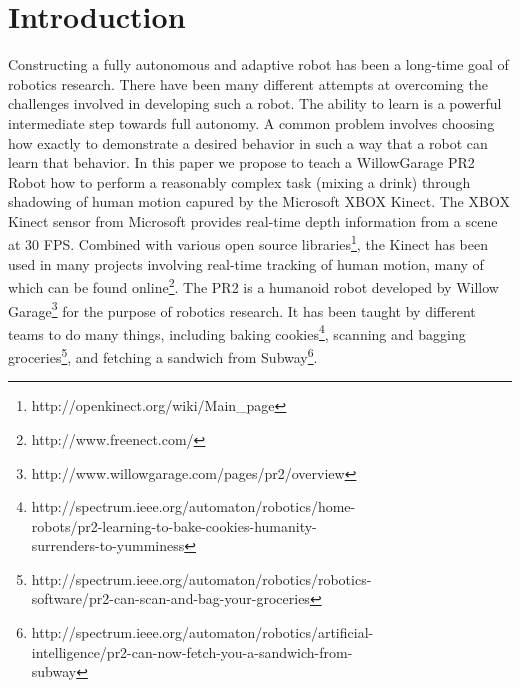 \documentclass{sig-alternate}
\begin{document}
\section{Introduction}
\label{sec:intro}
Constructing a fully autonomous and adaptive robot has been a long-time goal of robotics research. There have been many different attempts at overcoming the challenges involved in developing such a robot. The ability to learn is a powerful intermediate step towards full autonomy. A common problem involves choosing how exactly to demonstrate a desired behavior in such a way that a robot can learn that behavior. In this paper we propose to teach a WillowGarage PR2 Robot how to perform a reasonably complex task (mixing a drink) through shadowing of human motion capured by the Microsoft XBOX Kinect. The XBOX Kinect sensor from Microsoft provides real-time depth information from a scene at 30 FPS. Combined with various open source libraries\footnote{http://openkinect.org/wiki/Main\_page}, the Kinect has been used in many projects involving real-time tracking of human motion, many of which can be found online\footnote{http://www.freenect.com/}. The PR2 is a humanoid robot developed by  Willow Garage\footnote{http://www.willowgarage.com/pages/pr2/overview} for the purpose of robotics research. It  has been taught by different teams to do many things, including baking cookies\footnote{http://spectrum.ieee.org/automaton/robotics/home-\\robots/pr2-learning-to-bake-cookies-humanity-\\surrenders-to-yumminess}, scanning and bagging groceries\footnote{http://spectrum.ieee.org/automaton/robotics/robotics-\\software/pr2-can-scan-and-bag-your-groceries}, and fetching a sandwich from Subway\footnote{http://spectrum.ieee.org/automaton/robotics/artificial-\\intelligence/pr2-can-now-fetch-you-a-sandwich-from-\\subway}.
\end{document}
